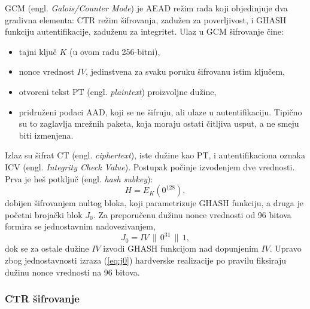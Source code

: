GCM (engl. \textit{Galois/Counter Mode}) \cite{sp80038d, mcgrew_viega} je AEAD režim rada koji objedinjuje dva gradivna elementa: CTR režim šifrovanja, zadužen za poverljivost, i GHASH funkciju autentifikacije, zaduženu za integritet. Ulaz u GCM šifrovanje čine:
\begin{itemize}[itemsep=2pt]
    \item tajni ključ $K$ (u ovom radu 256-bitni),
    \item nonce vrednost $IV$, jedinstvena za svaku poruku šifrovanu istim ključem,
    \item otvoreni tekst $\mathrm{PT}$ (engl. \textit{plaintext}) proizvoljne dužine,
    \item pridruženi podaci $\mathrm{AAD}$, koji se ne šifruju, ali ulaze u autentifikaciju. Tipično su to zaglavlja mrežnih paketa, koja moraju ostati čitljiva usput, a ne smeju biti izmenjena.
\end{itemize}
Izlaz su šifrat $\mathrm{CT}$ (engl. \textit{ciphertext}), iste dužine kao $\mathrm{PT}$, i autentifikaciona oznaka $\mathrm{ICV}$ (engl. \textit{Integrity Check Value}).
\smallbreak
Postupak počinje izvođenjem dve vrednosti. Prva je heš potključ (engl. \textit{hash subkey}):
\begin{equation}
    H = E_K(0^{128}),
\end{equation}
dobijen šifrovanjem nultog bloka, koji parametrizuje GHASH funkciju, a druga je početni brojački blok $J_0$. Za preporučenu dužinu nonce vrednosti od 96 bitova formira se jednostavnim nadovezivanjem,
\begin{equation}
    J_0 = IV \,\|\, 0^{31} \,\|\, 1,
    \label{eq:j0}
\end{equation}
dok se za ostale dužine $IV$ izvodi GHASH funkcijom nad dopunjenim $IV$. Upravo zbog jednostavnosti izraza (\ref{eq:j0}) hardverske realizacije po pravilu fiksiraju dužinu nonce vrednosti na 96 bitova.

\subsubsection{CTR šifrovanje}

